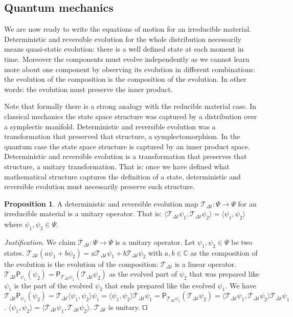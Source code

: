 \documentclass[smallextended]{svjour3}
\numberwithin{equation}{section}
\newenvironment{justification}{\emph{Justification}.}{\hfill\(\qed\)}
\theoremstyle{definition}
\newtheorem{prop}[equation]{Proposition}
\newenvironment{justification}{\emph{Justification}.}{\qed}
\begin{document}
\subsection{Quantum mechanics}

We are now ready to write the equations of motion for an irreducible material. Deterministic and reversible evolution for the whole distribution necessarily means quasi-static evolution: there is a well defined state at each moment in time. Moreover the components must evolve independently as we cannot learn more about one component by observing its evolution in different combinations: the evolution of the composition is the composition of the evolution. In other words: the evolution must preserve the inner product.

Note that formally there is a strong analogy with the reducible material case. In classical mechanics the state space structure was captured by a distribution over a symplectic manifold. Deterministic and reversible evolution was a transformation that preserved that structure, a symplectomorphism. In the quantum case the state space structure is captured by an inner product space. Deterministic and reversible evolution is a transformation that preserves that structure, a unitary transformation. That is: once we have defined what mathematical structure captures the definition of a state, deterministic and reversible evolution must necessarily preserve such structure.

\begin{prop}\label{prop:unitary_evolution}
	A deterministic and reversible evolution map $\mathcal{T}_{\Delta t}: \Psi \rightarrow \Psi$ for an irreducible material is a unitary operator. That is: $\langle \mathcal{T}_{\Delta t} \psi_1, \mathcal{T}_{\Delta t} \psi_2 \rangle = \langle \psi_1 , \psi_2 \rangle$ where $\psi_1, \psi_2 \in \Psi$.
\end{prop}

\begin{justification}
	We claim $\mathcal{T}_{\Delta t}: \Psi \rightarrow \Psi$ is a unitary operator. Let $\psi_1, \psi_2 \in \Psi$ be two states. $\mathcal{T}_{\Delta t}(a\psi_1+b\psi_2) = a \mathcal{T}_{\Delta t} \psi_1 + b \mathcal{T}_{\Delta t} \psi_2$ with $a,b \in \mathbb{C}$ as the composition of the evolution is the evolution of the composition: $\mathcal{T}_{\Delta t}$ is a linear operator. $\mathcal{T}_{\Delta t} \mathsf{P}_{\psi_1} (\psi_2) = \mathsf{P}_{\mathcal{T}_{\Delta t}\psi_1} (\mathcal{T}_{\Delta t}\psi_2)$ as the evolved part of $\psi_2$ that was prepared like $\psi_1$ is the part of the evolved $\psi_2$ that ends prepared like the evolved $\psi_1$. We have $\mathcal{T}_{\Delta t} \mathsf{P}_{\psi_1} (\psi_2) = \mathcal{T}_{\Delta t} \langle \psi_1 , \psi_2 \rangle \psi_1 = \langle \psi_1 , \psi_2 \rangle \mathcal{T}_{\Delta t} \psi_1 = \mathsf{P}_{\mathcal{T}_{\Delta t}\psi_1} (\mathcal{T}_{\Delta t}\psi_2) = \langle \mathcal{T}_{\Delta t}\psi_1 , \mathcal{T}_{\Delta t}\psi_2 \rangle \mathcal{T}_{\Delta t} \psi_1$. $\langle \psi_1 , \psi_2 \rangle = \langle \mathcal{T}_{\Delta t}\psi_1 , \mathcal{T}_{\Delta t}\psi_2 \rangle$. $\mathcal{T}_{\Delta t}$ is unitary.
\end{justification}
	
\end{document}
